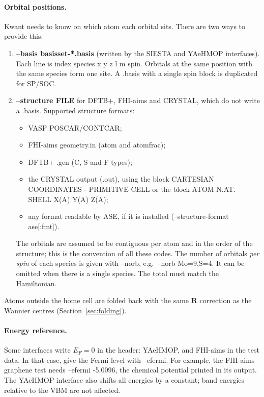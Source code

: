 \documentclass[11pt,a4paper]{article}
\newcommand{\code}[1]{{\ttfamily\def\_{\textunderscore\allowbreak}\def\slash{/\allowbreak}#1}}
\begin{document}
\paragraph{Orbital positions.} Kwant needs to know on which atom each orbital sits.
There are two ways to provide this:
\begin{enumerate}[nosep]
  \item \textbf{\code{--basis basis\_set-*.basis}} (written by the SIESTA and YAeHMOP
        interfaces). Each line is \code{index species x y z l m spin}. Orbitals at the same
        position with the same species form one site. A \code{.basis} with a single spin
        block is duplicated for SP/SOC.
  \item \textbf{\code{--structure FILE}} for DFTB+, FHI-aims and CRYSTAL, which do not
        write a \code{.basis}. Supported structure formats:
        \begin{itemize}[nosep]
          \item VASP \code{POSCAR}/\code{CONTCAR};
          \item FHI-aims \code{geometry.in} (\code{atom} and \code{atom\_frac});
          \item DFTB+ \code{.gen} (\code{C}, \code{S} and \code{F} types);
          \item the CRYSTAL output (\code{.out}), using the block
                \code{CARTESIAN COORDINATES - PRIMITIVE CELL} or the block
                \code{ATOM N.AT. SHELL X(A) Y(A) Z(A)};
          \item any format readable by ASE, if it is installed (\code{--structure-format ase[:fmt]}).
        \end{itemize}
        The orbitals are assumed to be contiguous per atom and in the order of the
        structure; this is the convention of all these codes. The number of orbitals
        \emph{per spin} of each species is given with \code{--norb}, e.g.\
        \code{--norb Mo=9,S=4}. It can be omitted when there is a single species. The
        total must match the Hamiltonian.
\end{enumerate}
Atoms outside the home cell are folded back with the same $\mathbf{R}$ correction as the
Wannier centres (Section~\ref{sec:folding}).

\paragraph{Energy reference.} Some interfaces write $E_F=0$ in the header: YAeHMOP, and
FHI-aims in the test data. In that case, give the Fermi level with \code{--efermi}. For
example, the FHI-aims graphene test needs \code{--efermi -5.0096}, the chemical potential
printed in its output. The YAeHMOP interface also shifts all energies by a constant;
band energies relative to the VBM are not affected.
\end{document}
